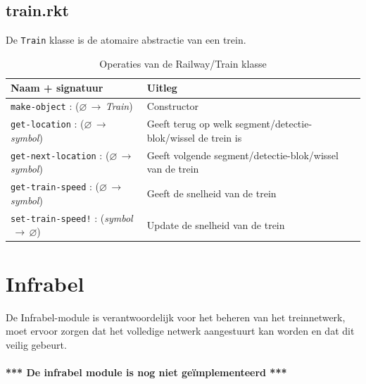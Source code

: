 \documentclass[a4paper, 11pt]{article}
\newcommand{\naar}{\,$\rightarrow$\,}
\renewcommand{\empty}{$\varnothing$}
\newcommand{\<}{\scriptsize\textless\normalsize}
\renewcommand{\>}{\scriptsize\textgreater\normalsize}
\begin{document}
\subsection{train.rkt} %
De \texttt{Train} klasse is de atomaire abstractie van een trein.
\begin{table}[H]
	\begin{center}
		{
		\begin{tabular}{|l l|}
			\hline
			\textbf{Naam + signatuur} & \textbf{Uitleg}\\
			\hline
			\texttt{make-object} : (\empty \naar \textit{Train}) & Constructor\\
			\hline
			\texttt{get-location} : (\empty \naar \textit{symbol}) & Geeft terug op welk segment/detectie-blok/wissel de trein is\\
			\texttt{get-next-location} : (\empty \naar \textit{symbol}) & Geeft volgende segment/detectie-blok/wissel van de trein\\
			\texttt{get-train-speed} : (\empty \naar \textit{symbol}) & Geeft de snelheid van de trein\\
			\texttt{set-train-speed!} : (\textit{symbol} \naar \empty) & Update de snelheid van de trein\\
			\hline
		\end{tabular}}
		\caption{Operaties van de Railway/Train klasse}
	\end{center}
\end{table}

\newpage
\section{Infrabel} %
De Infrabel-module is verantwoordelijk voor het beheren van het treinnetwerk, moet ervoor zorgen dat het volledige netwerk aangestuurt kan worden en dat dit veilig gebeurt.\\\\

\noindent \textbf{*** De infrabel module is nog niet ge\"implementeerd ***}\\

\end{document}
